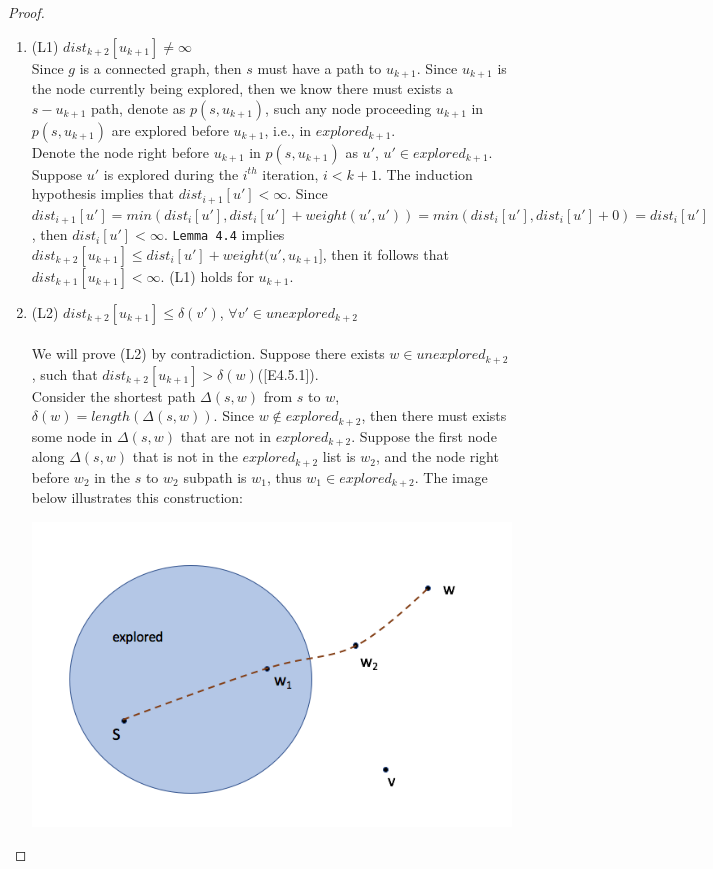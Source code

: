 \begin{proof}
\begin{itemize}
  \begin{enumerate}
  \item (L1) $dist_{k+2}[u_{k+1}] \neq \infty$
  \\
  Since $g$ is a connected graph, then $s$ must have a path to $u_{k+1}$. Since $u_{k+1}$ is the node currently being explored, then we know there must exists a $s-u_{k+1}$ path, denote as $p(s, u_{k+1})$, such any node proceeding $u_{k+1}$ in $p(s, u_{k+1})$ are explored before $u_{k+1}$, i.e., in $explored_{k+1}$. 
  \\
  Denote the node right before $u_{k+1}$ in $p(s, u_{k+1})$ as $u'$, $u' \in explored_{k+1}$. Suppose $u'$ is explored during the $i^{th}$ iteration, $i < k+1$. The induction hypothesis implies that $dist_{i+1}[u'] < \infty$. Since $dist_{i+1}[u'] = min(dist_i[u'], dist_i[u'] + weight(u', u')) = min(dist_i[u'], dist_i[u'] + 0) = dist_i[u']$, then $ dist_i[u'] < \infty$. \texttt{Lemma 4.4} implies $dist_{k+2}[u_{k+1}] \leq dist_i[u'] + weight(u', u_{k+1}]$, then it follows that $dist_{k+1}[u_{k+1}] < \infty$. (L1) holds for $u_{k+1}$. 
  \\
  \item (L2) $dist_{k+2}[u_{k+1}] \leq \delta(v')$, $\forall v' \in unexplored_{k+2}$
  \\\\
  We will prove (L2) by contradiction. Suppose there exists $w \in unexplored_{k+2}$, such that $dist_{k+2}[u_{k+1}] > \delta(w)$([E4.5.1]). 
  \\
  Consider the shortest path $\Delta(s, w)$ from $s$ to $w$, $\delta(w) = length(\Delta(s, w))$. Since $w \notin explored_{k+2}$, then there must exists some node in $\Delta(s, w)$ that are not in $explored_{k+2}$. Suppose the first node along $\Delta(s, w)$ that is not in the $explored_{k+2}$ list is $w_2$, and the node right before $w_2$ in the $s$ to $w_2$ subpath is $w_1$, thus $w_1 \in explored_{k+2}$. The image below illustrates this construction: 
  \\
  \begin{center}
  \includegraphics[scale = 0.55]{pic.png}

\end{center}
\end{enumerate}
\end{itemize}
\end{proof}
